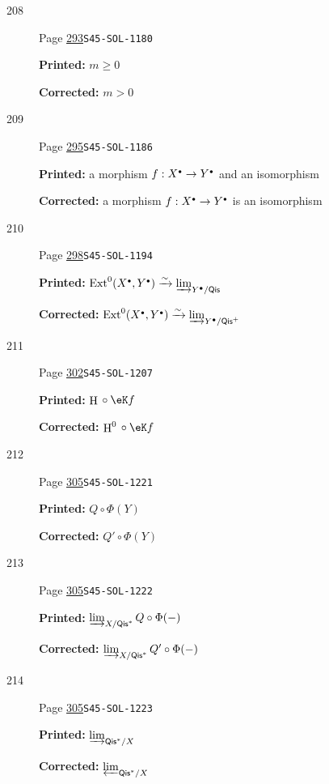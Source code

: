 \documentclass[oneside]{book}
\DeclareMathOperator{\ext}{Ext}
\DeclareMathOperator{\h}{H}
\newcommand{\iso}{\xrightarrow\sim}
\theoremstyle{sga-source}
\theoremstyle{sga-source-dash}
\theoremstyle{sga-source-dotdash}
\theoremstyle{sga-source-number-note-dash}
\theoremstyle{sga-source-note-number-dotdash}
\theoremstyle{sga-source-example-dotdash}
\theoremstyle{sga-source-inline-number}
\theoremstyle{sga-source-bare-number}
\theoremstyle{sga-source}
\let\oldbullet\bullet
\renewcommand{\bullet}{\textnormal{\tiny$\oldbullet$}}
\begin{document}
\begin{description}
\item[\hypertarget{apparatus:EN-0208}{208}] Page \hyperlink{printpage:en:293}{293}\quad\texttt{S45-SOL-1180}
\par\noindent\textbf{Printed:} $m\geqslant 0$
\par\noindent\textbf{Corrected:} $m>0$
\smallskip
\item[\hypertarget{apparatus:EN-0209}{209}] Page \hyperlink{printpage:en:295}{295}\quad\texttt{S45-SOL-1186}
\par\noindent\textbf{Printed:} a morphism $f:X^\bullet \to Y^\bullet$ and
an isomorphism
\par\noindent\textbf{Corrected:} a morphism $f:X^\bullet \to Y^\bullet$ is
an isomorphism
\smallskip
\item[\hypertarget{apparatus:EN-0210}{210}] Page \hyperlink{printpage:en:298}{298}\quad\texttt{S45-SOL-1194}
\par\noindent\textbf{Printed:} \(\ext^0(X^\bullet,Y^\bullet) \iso \varinjlim_{Y^\bullet/\mathsf{Qis}}\)
\par\noindent\textbf{Corrected:} \(\ext^0(X^\bullet,Y^\bullet) \iso \varinjlim_{Y^\bullet/\mathsf{Qis}^+}\)
\smallskip
\item[\hypertarget{apparatus:EN-0211}{211}] Page \hyperlink{printpage:en:302}{302}\quad\texttt{S45-SOL-1207}
\par\noindent\textbf{Printed:} \(\h{}\circ \eK f\)
\par\noindent\textbf{Corrected:} \(\h^0{}\circ \eK f\)
\smallskip
\item[\hypertarget{apparatus:EN-0212}{212}] Page \hyperlink{printpage:en:305}{305}\quad\texttt{S45-SOL-1221}
\par\noindent\textbf{Printed:} $Q\circ \Phi(Y)$
\par\noindent\textbf{Corrected:} $Q'\circ \Phi(Y)$
\smallskip
\item[\hypertarget{apparatus:EN-0213}{213}] Page \hyperlink{printpage:en:305}{305}\quad\texttt{S45-SOL-1222}
\par\noindent\textbf{Printed:} \(\varinjlim_{X/\mathsf{Qis}^\ast} Q\circ\Phi(-)\)
\par\noindent\textbf{Corrected:} \(\varinjlim_{X/\mathsf{Qis}^\ast} Q'\circ\Phi(-)\)
\smallskip
\item[\hypertarget{apparatus:EN-0214}{214}] Page \hyperlink{printpage:en:305}{305}\quad\texttt{S45-SOL-1223}
\par\noindent\textbf{Printed:} \(\varinjlim_{\mathsf{Qis}^\ast/X}\)
\par\noindent\textbf{Corrected:} \(\varprojlim_{\mathsf{Qis}^\ast/X}\)

\end{description}
\end{document}
